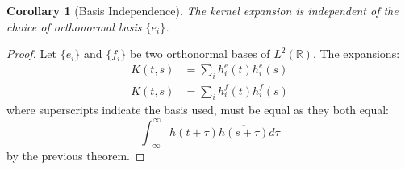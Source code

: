\documentclass{article}
\newtheorem{corollary}[theorem]{Corollary}
\begin{document}
\begin{corollary}[Basis Independence]
The kernel expansion is independent of the choice of orthonormal basis $\{e_i\}$.
\end{corollary}

\begin{proof}
Let $\{e_i\}$ and $\{f_i\}$ be two orthonormal bases of $L^2(\mathbb{R})$. The expansions:
\begin{align*}
    K(t,s) &= \sum_i h_i^e(t)h_i^e(s) \\
    K(t,s) &= \sum_i h_i^f(t)h_i^f(s)
\end{align*}
where superscripts indicate the basis used, must be equal as they both equal:
\begin{equation*}
    \int_{-\infty}^{\infty} h(t+\tau)\overline{h(s+\tau)}d\tau
\end{equation*}
by the previous theorem.
\end{proof}
\end{document}
